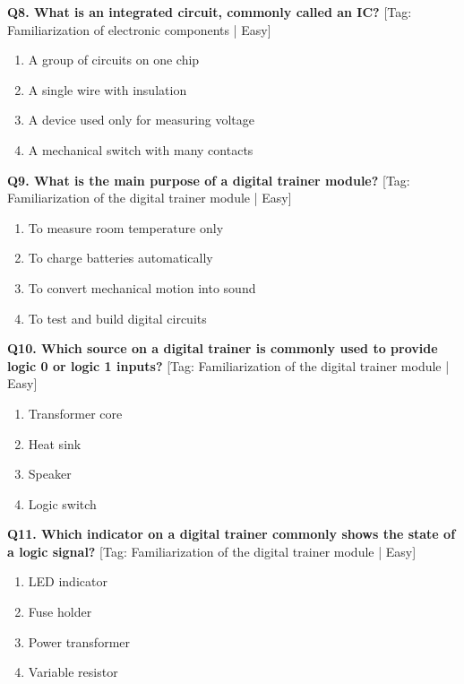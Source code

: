 \noindent\textbf{Q8. What is an integrated circuit, commonly called an IC?} \hfill [Tag: Familiarization of electronic components | Easy]
\begin{enumerate}[label=(\alph*),topsep=2pt,itemsep=1pt,partopsep=0pt,parsep=0pt]
    \item {A group of circuits on one chip}
    \item {A single wire with insulation}
    \item {A device used only for measuring voltage}
    \item {A mechanical switch with many contacts}
\end{enumerate}
\vspace{2mm}

\noindent\textbf{Q9. What is the main purpose of a digital trainer module?} \hfill [Tag: Familiarization of the digital trainer module | Easy]
\begin{enumerate}[label=(\alph*),topsep=2pt,itemsep=1pt,partopsep=0pt,parsep=0pt]
    \item {To measure room temperature only}
    \item {To charge batteries automatically}
    \item {To convert mechanical motion into sound}
    \item {To test and build digital circuits}
\end{enumerate}
\vspace{2mm}

\noindent\textbf{Q10. Which source on a digital trainer is commonly used to provide logic 0 or logic 1 inputs?} \hfill [Tag: Familiarization of the digital trainer module | Easy]
\begin{enumerate}[label=(\alph*),topsep=2pt,itemsep=1pt,partopsep=0pt,parsep=0pt]
    \item {Transformer core}
    \item {Heat sink}
    \item {Speaker}
    \item {Logic switch}
\end{enumerate}
\vspace{2mm}

\noindent\textbf{Q11. Which indicator on a digital trainer commonly shows the state of a logic signal?} \hfill [Tag: Familiarization of the digital trainer module | Easy]
\begin{enumerate}[label=(\alph*),topsep=2pt,itemsep=1pt,partopsep=0pt,parsep=0pt]
    \item {LED indicator}
    \item {Fuse holder}
    \item {Power transformer}
    \item {Variable resistor}
\end{enumerate}
\vspace{2mm}


